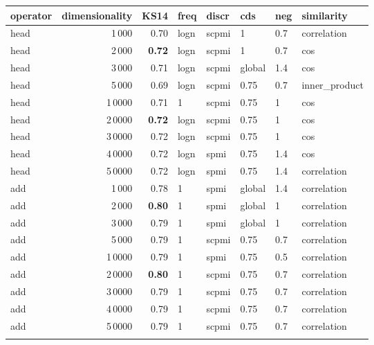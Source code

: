 \begin{tabular}{lrrlllll}
\toprule
operator &  dimensionality &  KS14 &  freq &  discr &     cds &  neg &     similarity \\
\midrule
    head &            1\,000 &  0.70 &  logn &  scpmi &       1 &  0.7 &    correlation \\
    head &            2\,000 &  \textbf{0.72} &  logn &  scpmi &       1 &  0.7 &            cos \\
    head &            3\,000 &  0.71 &  logn &  scpmi &  global &  1.4 &            cos \\
    head &            5\,000 &  0.69 &  logn &  scpmi &    0.75 &  0.7 &  inner\_product \\
    head &           1\,0000 &  0.71 &     1 &  scpmi &    0.75 &    1 &            cos \\
    head &           2\,0000 &  \textbf{0.72} &  logn &  scpmi &    0.75 &    1 &            cos \\
    head &           3\,0000 &  0.72 &  logn &  scpmi &    0.75 &    1 &            cos \\
    head &           4\,0000 &  0.72 &  logn &   spmi &    0.75 &  1.4 &            cos \\
    head &           5\,0000 &  0.72 &  logn &   spmi &    0.75 &  1.4 &    correlation \\ \addlinespace
     add &            1\,000 &  0.78 &     1 &   spmi &  global &  1.4 &    correlation \\
     add &            2\,000 &  \textbf{0.80} &     1 &   spmi &  global &    1 &    correlation \\
     add &            3\,000 &  0.79 &     1 &   spmi &  global &    1 &    correlation \\
     add &            5\,000 &  0.79 &     1 &  scpmi &    0.75 &  0.7 &    correlation \\
     add &           1\,0000 &  0.79 &     1 &   spmi &    0.75 &  0.5 &    correlation \\
     add &           2\,0000 &  \textbf{0.80} &     1 &  scpmi &    0.75 &  0.7 &    correlation \\
     add &           3\,0000 &  0.79 &     1 &  scpmi &    0.75 &  0.7 &    correlation \\
     add &           4\,0000 &  0.79 &     1 &  scpmi &    0.75 &  0.7 &    correlation \\
     add &           5\,0000 &  0.79 &     1 &  scpmi &    0.75 &  0.7 &    correlation \\ \addlinespace

\end{tabular}
